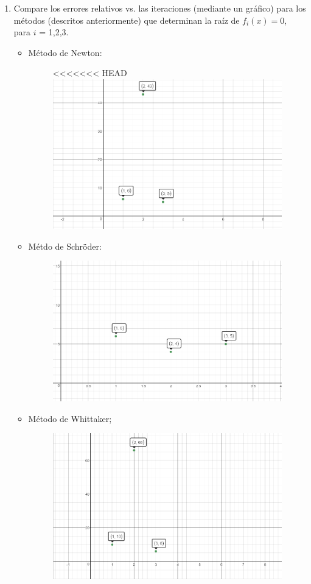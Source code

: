 \documentclass{udparticle}
\begin{document}
\begin{enumerate}
\begin{enumerate}
		\item Compare los errores relativos vs. las iteraciones (mediante un gráfico) para los métodos (descritos
			anteriormente) que determinan la raíz de $f_{i}(x)=0$, para $i$ = 1,2,3.	
			\begin{itemize}
				\item Método de Newton:
				\begin{figure}[H]
					\centering
<<<<<<< HEAD
					\includegraphics[width=10cm]{NewtonEj6} 
				\end{figure}								 
				
				
				\item Métdo de Schröder: 
				 \begin{figure}[H]
					\centering
					\includegraphics[width=10cm]{SchroderEj6} 
				\end{figure}	
				 
				 
				 \item Método de Whittaker;
				 \begin{figure}[H]
					\centering
					\includegraphics[width=10cm]{WhittakerEj6} 
				\end{figure}	
			\end{itemize}				
		

\end{enumerate}
\end{enumerate}
\end{document}
